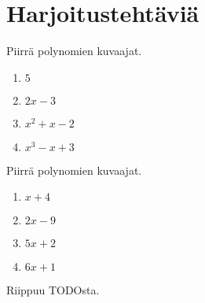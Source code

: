 %
%
%
%
%
%
%
%
%

\section{Harjoitustehtäviä}

\begin{tehtava}
    Piirrä polynomien kuvaajat.
    \begin{enumerate}
        \item $5$
        \item $2x-3$
        \item $x^2+x-2$
        \item $x^3-x+3$
    \end{enumerate}
    \begin{vastaus}
    \end{vastaus}
\end{tehtava}

\begin{tehtava}
    Piirrä polynomien kuvaajat.
    \begin{enumerate}
        \item $x+4$
        \item $2x-9$
        \item $5x+2$
        \item $6x+1$
    \end{enumerate}
    \begin{vastaus}
        Riippuu TODOsta.
    \end{vastaus}
\end{tehtava}

